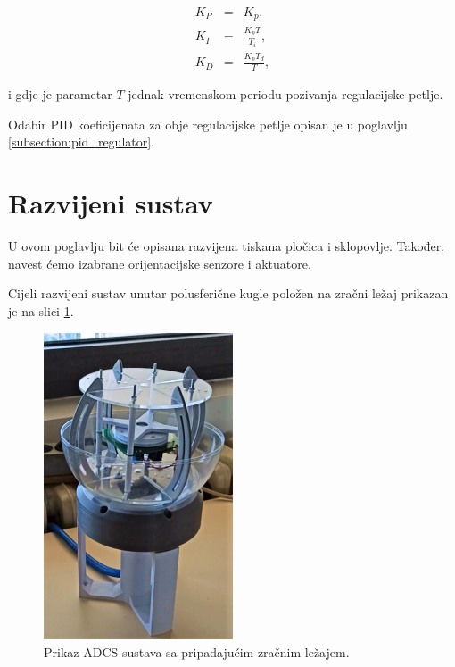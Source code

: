 \documentclass[times, utf8, diplomski, numeric]{templates/template}
\begin{document}
{{{{                \begin{equation}
                    \begin{array}{rcl}
                        K_P & = & K_p,\\
                        K_I & = & \frac{K_p T}{T_i}, \\
                        K_D & = & \frac{K_p T_d}{T},
                    \end{array}
                \end{equation}

                i gdje je parametar $T$ jednak vremenskom periodu pozivanja regulacijske petlje.

                Odabir PID koeficijenata za obje regulacijske petlje opisan je u poglavlju \ref{subsection:pid_regulator}.
            }
        }
    }

    \section{Razvijeni sustav}{
        U ovom poglavlju bit će opisana razvijena tiskana pločica i sklopovlje. Također, navest ćemo izabrane orijentacijske senzore i aktuatore.

        Cijeli razvijeni sustav unutar polusferične kugle položen na zračni ležaj prikazan je na slici \ref{fig:slika_sustava}.

        \begin{figure}[htb]
        \centering
        \includegraphics[width=0.5\textwidth]{images/slika_sustava.png}
        \caption{Prikaz ADCS sustava sa pripadajućim zračnim ležajem.}
        \label{fig:slika_sustava}
        \end{figure}

}}
\end{document}
